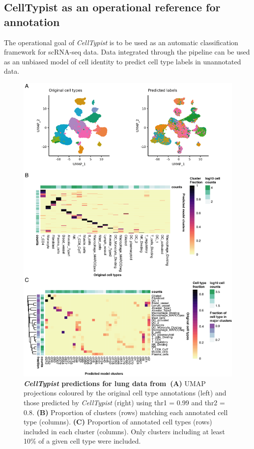 \subsection{CellTypist as an operational reference for annotation}
\label{section_test}
The operational goal of \textit{CellTypist} is to be used as an automatic classification framework for scRNA-seq data. Data integrated through the pipeline can be used as an unbiased model of cell identity to predict cell type labels in unannotated data.

\begin{figure}[pht!] 
\centering
\includegraphics[scale=0.83]{Chapter4/Figs/chap4_preds.png} %
\caption[\textit{CellTypist} predictions for lung data from~\citep{madissoon_lung_2019}]{\textbf{\textit{CellTypist} predictions for lung data from~\citep{madissoon_lung_2019}}\newline\textbf{(A)} UMAP projections coloured by the original cell type annotations (left) and those predicted by \textit{CellTypist} (right) using thr1 = 0.99 and thr2 = 0.8. \textbf{(B)} Proportion of clusters (rows) matching each annotated cell type (columns). \textbf{(C)} Proportion of annotated cell types (rows) included in each cluster (columns). Only clusters including at least 10\% of a given cell type were included.}
\label{fig:chap4_preds}
\end{figure}

